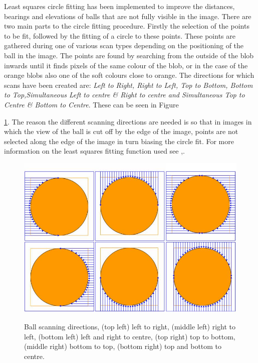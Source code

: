 Least squares circle fitting has been implemented to improve the distances, bearings and elevations of balls that are not fully
visible in the image. There are two main parts to the circle fitting procedure. Firstly the selection of the points to be fit, followed by the fitting of a circle to these points. These points are gathered during one of various scan types depending on the positioning of the ball in the image. The points are found by searching from the outside of the blob inwards until it finds pixels of the same colour of the blob, or in the case of the orange blobs also one of the soft colours close to orange. The directions for which scans have been created are: \emph{Left to Right, Right to Left, Top to Bottom, Bottom to Top,Simultaneous Left to centre \& Right to centre and Simultaneous Top to Centre \& Bottom to Centre}. These can be seen in Figure~{\ref{fig:objectBall3}. The reason the different scanning directions are needed is so that in images in which the view of the ball is cut off by the edge of the image, points are not selected along the edge of the image in turn biasing the circle fit. For more information on the least squares fitting function used see \cite{Seysener2003},\cite{SeysenerMurchMiddleton2004}.

\begin{figure}[!ht]
\begin{center}
    \scalebox{0.3} {\includegraphics{stevenfigs/objectBall3.png} }
    \caption{Ball scanning directions,  (top left) left to right, (middle left) right to left, (bottom left) left and right to centre, (top right)  top to bottom, (middle right) bottom to top, (bottom right) top and bottom to centre.}
    \label{fig:objectBall3}
\end{center}
\end{figure}

}
